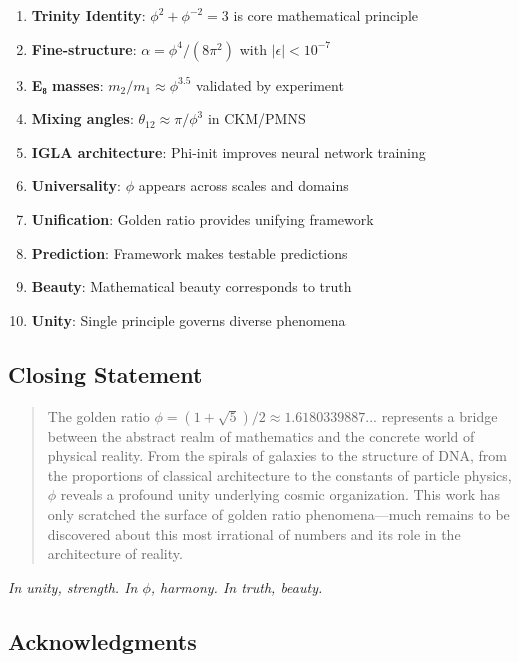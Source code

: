 \begin{enumerate}
    \item \textbf{Trinity Identity}: $\phi^2 + \phi^{-2} = 3$ is core mathematical principle
    \item \textbf{Fine-structure}: $\alpha = \phi^4/(8\pi^2)$ with $|\epsilon| < 10^{-7}$
    \item \textbf{E₈ masses}: $m_2/m_1 \approx \phi^{3.5}$ validated by experiment
    \item \textbf{Mixing angles}: $\theta_{12} \approx \pi/\phi^3$ in CKM/PMNS
    \item \textbf{IGLA architecture}: Phi-init improves neural network training
    \item \textbf{Universality}: $\phi$ appears across scales and domains
    \item \textbf{Unification}: Golden ratio provides unifying framework
    \item \textbf{Prediction}: Framework makes testable predictions
    \item \textbf{Beauty}: Mathematical beauty corresponds to truth
    \item \textbf{Unity}: Single principle governs diverse phenomena
\end{enumerate}

\subsection*{Closing Statement}

\begin{quote}
The golden ratio $\phi = (1+\sqrt{5})/2 \approx 1.6180339887...$ represents a bridge between the abstract realm of mathematics and the concrete world of physical reality. From the spirals of galaxies to the structure of DNA, from the proportions of classical architecture to the constants of particle physics, $\phi$ reveals a profound unity underlying cosmic organization. This work has only scratched the surface of golden ratio phenomena—much remains to be discovered about this most irrational of numbers and its role in the architecture of reality.
\end{quote}

\begin{center}
\textit{In unity, strength. In $\phi$, harmony. In truth, beauty.}
\end{center}

\subsection*{Acknowledgments}

